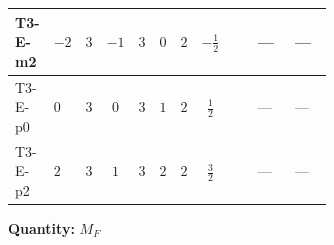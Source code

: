 \documentclass[8pt]{article}
\begin{document}
\begin{landscape}
\begin{longtable}{@{}llcccccc >{\raggedright\arraybackslash}p{0.21\linewidth} >{\raggedright\arraybackslash}p{0.21\linewidth} >{\raggedright\arraybackslash}p{0.21\linewidth}@{}}
\midrule
T3-E-m2 & $-2$ & $3$ & $-1$ & $3$ & $0$ & $2$ & $-\frac{1}{2}$ & \scriptsize\adjustbox{max width=\linewidth}{$\begin{gathered} \frac{3}{4} (\left(\left({y_1}\right)^{T}\,\left({y_1}\right)^{*}\,{M_F}\right)_{ij}+\left({M_F}\,\left({y_2}\right)^{\dagger}\,{y_2}\right)_{ij})\end{gathered}$} & --- & --- \\
\midrule
T3-E-p0 & $0$ & $3$ & $0$ & $3$ & $1$ & $2$ & $\frac{1}{2}$ & \scriptsize\adjustbox{max width=\linewidth}{$\begin{gathered} \frac{3}{4} (\left(\left({y_1}\right)^{T}\,\left({y_1}\right)^{*}\,{M_F}\right)_{ij}+\left({M_F}\,\left({y_2}\right)^{\dagger}\,{y_2}\right)_{ij})\end{gathered}$} & --- & --- \\
\midrule
T3-E-p2 & $2$ & $3$ & $1$ & $3$ & $2$ & $2$ & $\frac{3}{2}$ & \scriptsize\adjustbox{max width=\linewidth}{$\begin{gathered} \frac{3}{4} (\left(\left({y_1}\right)^{T}\,\left({y_1}\right)^{*}\,{M_F}\right)_{ij}+\left({M_F}\,\left({y_2}\right)^{\dagger}\,{y_2}\right)_{ij})\end{gathered}$} & --- & --- \\
\midrule
\bottomrule
\end{longtable}
\clearpage
\noindent\textbf{Quantity: }$M_F$\par\smallskip

\end{landscape}
\end{document}
